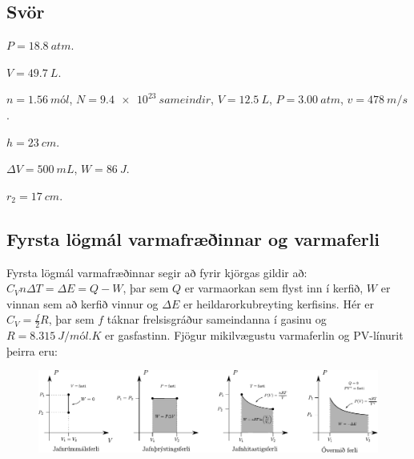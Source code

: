 \begin{enumerate}[label = \textbf{Dæmi \thechapter.\arabic*.}]

\end{enumerate}

\subsection*{Svör}

\begin{enumerate*}[label = \vspace{0.15cm} \textbf{(\arabic*)}]
\setcounter{enumi}{7}
  \item $P = \SI{18.8}{atm}$.
  \item $V = \SI{49.7}{L}$.
  \item $n = \SI{1.56}{mól}$, $N = \SI{9.4e23}{sameindir}$, $V = \SI{12,5}{L}$, $P = \SI{3.00}{atm}$, $v = \SI{478}{m/s}$.
  \item $h = \SI{23}{cm}$.
  \item $\Delta V = \SI{500}{mL}$, $W = \SI{86}{J}$.
  \item $r_2 = \SI{17}{cm}$.
\end{enumerate*}

\newpage

\subsection*{Fyrsta lögmál varmafræðinnar og varmaferli}

\begin{tcolorbox}
Fyrsta lögmál varmafræðinnar segir að fyrir kjörgas gildir að: $C_V n \Delta T = \Delta E = Q - W$, þar sem $Q$ er varmaorkan sem flyst inn í kerfið, $W$ er vinnan sem að kerfið vinnur og $\Delta E$ er heildarorkubreyting kerfisins. Hér er $C_V = \frac{f}{2}R$, þar sem $f$ táknar frelsisgráður sameindanna í gasinu og $R = \SI{8.315}{J/mól.K}$ er gasfastinn. Fjögur mikilvægustu varmaferlin og PV-línurit þeirra eru:
\begin{figure}[H]
    \centering
    \includegraphics[width = \textwidth]{figures/varmaferlin.pdf}
\end{figure}
\end{tcolorbox}

